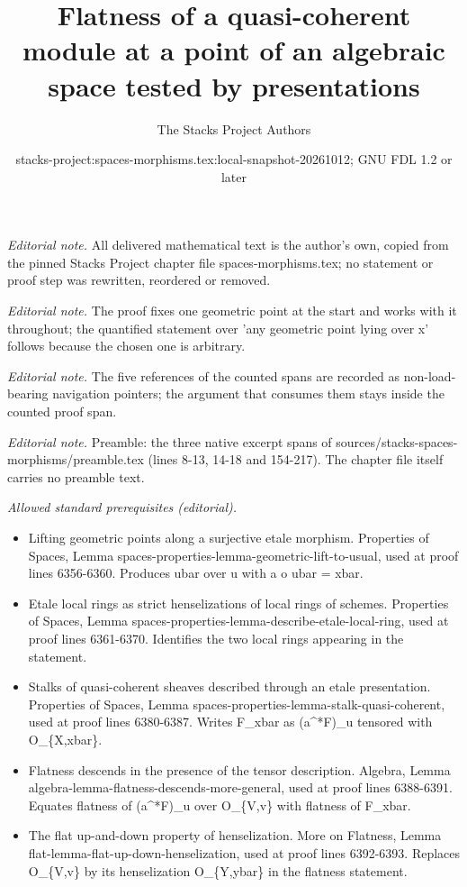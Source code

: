 \documentclass[10pt,a4paper]{amsart}
\title{Flatness of a quasi-coherent module at a point of an algebraic space tested by presentations}
\author{The Stacks Project Authors}
\date{stacks-project:spaces-morphisms.tex:local-snapshot-20261012; GNU FDL 1.2 or later}
\theoremstyle{plain}
\theoremstyle{definition}
\theoremstyle{remark}
\numberwithin{equation}{subsection}
\begin{document}
\maketitle
\setcounter{subsection}{1}
\noindent\textit{Editorial note.} All delivered mathematical text is the author's own, copied from the pinned Stacks Project chapter file spaces-morphisms.tex; no statement or proof step was rewritten, reordered or removed.\par\medskip
\noindent\textit{Editorial note.} The proof fixes one geometric point at the start and works with it throughout; the quantified statement over 'any geometric point lying over x' follows because the chosen one is arbitrary.\par\medskip
\noindent\textit{Editorial note.} The five references of the counted spans are recorded as non-load-bearing navigation pointers; the argument that consumes them stays inside the counted proof span.\par\medskip
\noindent\textit{Editorial note.} Preamble: the three native excerpt spans of sources/stacks-spaces-morphisms/preamble.tex (lines 8-13, 14-18 and 154-217). The chapter file itself carries no preamble text.\par\medskip
\noindent\textit{Allowed standard prerequisites (editorial).}\begin{itemize}
\item Lifting geometric points along a surjective etale morphism. Properties of Spaces, Lemma spaces-properties-lemma-geometric-lift-to-usual, used at proof lines 6356-6360. Produces ubar over u with a o ubar = xbar.
\item Etale local rings as strict henselizations of local rings of schemes. Properties of Spaces, Lemma spaces-properties-lemma-describe-etale-local-ring, used at proof lines 6361-6370. Identifies the two local rings appearing in the statement.
\item Stalks of quasi-coherent sheaves described through an etale presentation. Properties of Spaces, Lemma spaces-properties-lemma-stalk-quasi-coherent, used at proof lines 6380-6387. Writes F\_xbar as (a\textasciicircum{}*F)\_u tensored with O\_\{X,xbar\}.
\item Flatness descends in the presence of the tensor description. Algebra, Lemma algebra-lemma-flatness-descends-more-general, used at proof lines 6388-6391. Equates flatness of (a\textasciicircum{}*F)\_u over O\_\{V,v\} with flatness of F\_xbar.
\item The flat up-and-down property of henselization. More on Flatness, Lemma flat-lemma-flat-up-down-henselization, used at proof lines 6392-6393. Replaces O\_\{V,v\} by its henselization O\_\{Y,ybar\} in the flatness statement.
\end{itemize}\medskip
\end{document}
